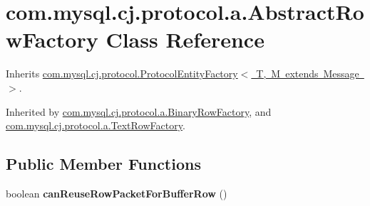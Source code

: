 \hypertarget{classcom_1_1mysql_1_1cj_1_1protocol_1_1a_1_1_abstract_row_factory}{}\section{com.\+mysql.\+cj.\+protocol.\+a.\+Abstract\+Row\+Factory Class Reference}
\label{classcom_1_1mysql_1_1cj_1_1protocol_1_1a_1_1_abstract_row_factory}


Inherits \mbox{\hyperlink{interfacecom_1_1mysql_1_1cj_1_1protocol_1_1_protocol_entity_factory}{com.\+mysql.\+cj.\+protocol.\+Protocol\+Entity\+Factory$<$ T, M extends Message $>$}}.



Inherited by \mbox{\hyperlink{classcom_1_1mysql_1_1cj_1_1protocol_1_1a_1_1_binary_row_factory}{com.\+mysql.\+cj.\+protocol.\+a.\+Binary\+Row\+Factory}}, and \mbox{\hyperlink{classcom_1_1mysql_1_1cj_1_1protocol_1_1a_1_1_text_row_factory}{com.\+mysql.\+cj.\+protocol.\+a.\+Text\+Row\+Factory}}.

\subsection*{Public Member Functions}
\begin{DoxyCompactItemize}
\item 
\mbox{\label{classcom_1_1mysql_1_1cj_1_1protocol_1_1a_1_1_abstract_row_factory_a4692c57d253b16f586b8c201c6109ab0}} 
boolean {\bfseries can\+Reuse\+Row\+Packet\+For\+Buffer\+Row} ()
\end{DoxyCompactItemize}
